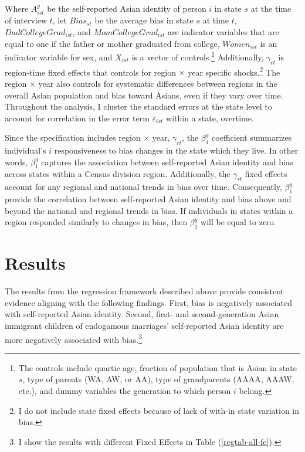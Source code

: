 Where $A_{ist}^g$ be the self-reported Asian identity of person $i$ in state $s$ at the time of interview $t$, let $Bias_{st}$ be the average bias in state $s$ at time $t$, $DadCollegeGrad_{ist}$, and $MomCollegeGrad_{ist}$ are indicator variables that are equal to one if the father or mother graduated from college, $Women_{ist}$ is an indicator variable for sex, and $X_{ist}$ is a vector of controls.\footnote{The controls include quartic age, fraction of population that is Asian in state $s$, type of parents (WA, AW, or AA), type of grandparents (AAAA, AAAW, etc.), and dummy variables the generation to which person $i$ belong.} Additionally, $\gamma_{rt}$ is region-time fixed effects that controls for region $\times$ year specific shocks.\footnote{I do not include state fixed effects because of lack of with-in state variation in bias.} The region $\times$ year also controls for systematic differences between regions in the overall Asian population and bias toward Asians, even if they vary over time. Throughout the analysis, I cluster the standard errors at the state level to account for correlation in the error term $\varepsilon_{ist}$ within a state, overtime.

Since the specification includes region $\times$ year, $\gamma_{rt}$, the $\beta_1^g$ coefficient summarizes individual's $i$ responsiveness to bias changes in the state which they live. In other words, $\beta_1^g$ captures the association between self-reported Asian identity and bias across states within a Census division region. Additionally, the $\gamma_{rt}$ fixed effects account for any regional and national trends in bias over time. Consequently, $\beta_1^g$ provide the correlation between self-reported Asian identity and bias above and beyond the national and regional trends in bias. If individuals in states within a region responded similarly to changes in bias, then $\beta_1^g$ will be equal to zero. 

\section{Results}\label{sec:results}
The results from the regression framework described above provide consistent evidence aligning with the following findings. First, bias is negatively associated with self-reported Asian identity. Second, first- and second-generation Asian immigrant children of endogamous marriages' self-reported Asian identity are more negatively associated with bias.\footnote{I show the results with different Fixed Effects in Table (\ref{regtab-all-fe}).}

